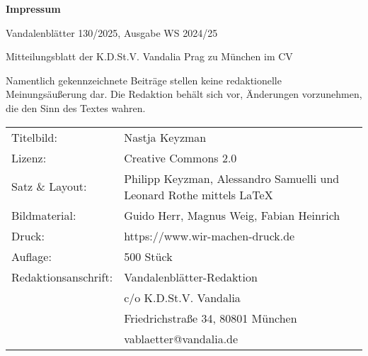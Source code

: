 \vspace*{7mm}
\begin{minipage}[h!]{160mm}
	\small{
		\textbf{Impressum}
		
		Vandalenblätter 130/2025, Ausgabe WS 2024/25
		
		Mitteilungsblatt der K.D.St.V. Vandalia Prag zu München im CV
		
		Namentlich gekennzeichnete Beiträge stellen keine redaktionelle Meinungsäußerung dar. Die Redaktion behält sich vor, Änderungen vorzunehmen, die den Sinn des Textes wahren.
		\\
		\vspace{6pt}
		\noindent\begin{tabular}{ll}
			Titelbild: & Nastja Keyzman\\
			Lizenz: & Creative Commons 2.0 \\
			Satz \& Layout: & Philipp Keyzman, Alessandro Samuelli und Leonard Rothe mittels
			\LaTeX
			\\
			Bildmaterial: & Guido Herr, Magnus Weig, Fabian Heinrich\\
			Druck: & https://www.wir-machen-druck.de\\
			Auflage: & 500 Stück\\
			Redaktionsanschrift: & Vandalenblätter-Redaktion \\	
			& c/o K.D.St.V. Vandalia\\
			& Friedrichstraße 34, 80801 München\\
			& vablaetter@vandalia.de
		\end{tabular}
	}
	
\end{minipage}
\clearpage
